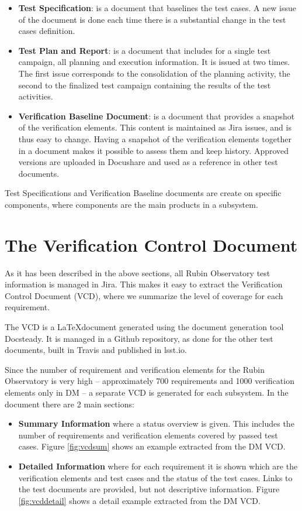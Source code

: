 \begin{itemize}
\item \textbf{Test Specification}: is a document that baselines the test cases. 
A new issue of the document is done each time there is a substantial change in the test cases definition.
\item \textbf{Test Plan and Report}: is a document that includes for a single test campaign, all planning and execution information. 
It  is issued at two times. The first issue corresponds to the consolidation of the planning activity,  
the second to the finalized test campaign containing the results of the test activities.
\item \textbf{Verification Baseline Document}: is a document that provides a snapshot of the verification elements. 
This content is maintained as Jira issues, and is thus easy to change.
Having a snapshot of the verification elements together in a document makes it possible to assess them and keep history.
Approved versions are uploaded in Docushare and used as a reference in other test documents.
\end{itemize}

Test Specifications and Verification Baseline documents are create on specific components, where components are the main products in a subsystem.


\section{The Verification Control Document}

As it has been described in the above sections, all Rubin Observatory test information is managed in Jira. 
This makes it easy to extract the Verification Control Document (VCD), where we summarize the level of coverage for each requirement.

The VCD is a \LaTeX document generated using the document generation tool Docsteady. 
It is managed in a Github repository, as done for the other test documents, built in Travis and published in lsst.io.

Since the number of requirement and verification elements for the Rubin Observatory is very high --
approximately 700 requirements and 1000 verification elements only in DM -- a separate VCD is generated for each subsystem.
In the document there are 2 main sections:

\begin{itemize}
\item \textbf{Summary Information} where a status overview is given. 
This includes the number of requirements and verification elements covered by passed test cases.
Figure \ref{fig:vcdsum} shows an example extracted from the DM VCD.
\item \textbf{Detailed Information} where for each requirement it is shown which are the verification elements and test cases
and the status of the test cases. Links to the test documents are provided, but not descriptive information.
Figure \ref{fig:vcddetail} shows a detail example extracted from the DM VCD.
\end{itemize}

